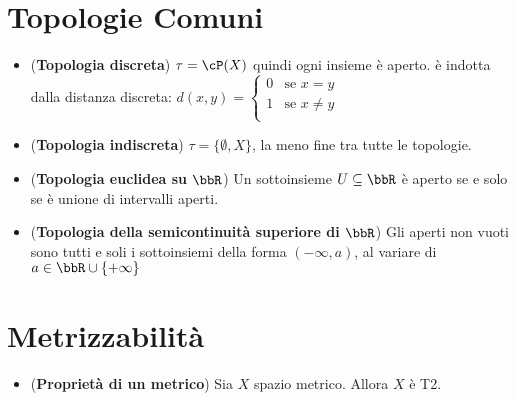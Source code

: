 \documentclass[a4paper,NoNotes,GeneralMath]{stdmdoc}
\begin{document}
	\section*{Topologie Comuni}
	\begin{itemize}
		\item ({\bf Topologia discreta}) $\tau = \cP (X)$ quindi ogni insieme è aperto. è indotta dalla distanza discreta: $d(x,y) = \left\{ \begin{array}{cr} 0 & \text{se } x = y \\ 1 & \text{se } x \neq y \\ \end{array} \right. $
		\item ({\bf Topologia indiscreta}) $\tau = \{\emptyset, X\}$, la meno fine tra tutte le topologie.
		\item ({\bf Topologia euclidea su $\bbR$}) Un sottoinsieme $U \subseteq \bbR$ è aperto se e solo se è unione di intervalli aperti.
		\item ({\bf Topologia della semicontinuità superiore di $\bbR$}) Gli aperti non vuoti sono tutti e soli i sottoinsiemi della forma $( - \infty , a)$, al variare di $a \in \bbR \cup \{+ \infty\}$
	\end{itemize}

	\section*{Metrizzabilità}
	\begin{itemize}
		\item ({\bf Proprietà di un metrico}) Sia $X$ spazio metrico. Allora $X$ è T2.
	\end{itemize}
\end{document}
